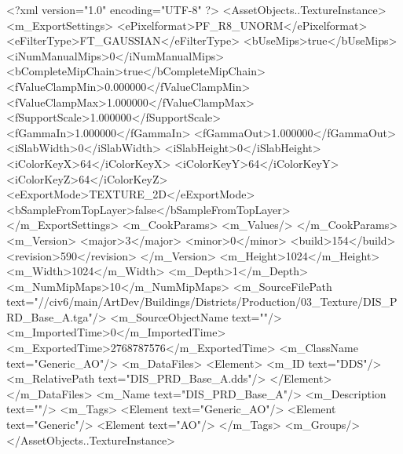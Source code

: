 <?xml version="1.0" encoding="UTF-8" ?>
<AssetObjects..TextureInstance>
	<m_ExportSettings>
		<ePixelformat>PF_R8_UNORM</ePixelformat>
		<eFilterType>FT_GAUSSIAN</eFilterType>
		<bUseMips>true</bUseMips>
		<iNumManualMips>0</iNumManualMips>
		<bCompleteMipChain>true</bCompleteMipChain>
		<fValueClampMin>0.000000</fValueClampMin>
		<fValueClampMax>1.000000</fValueClampMax>
		<fSupportScale>1.000000</fSupportScale>
		<fGammaIn>1.000000</fGammaIn>
		<fGammaOut>1.000000</fGammaOut>
		<iSlabWidth>0</iSlabWidth>
		<iSlabHeight>0</iSlabHeight>
		<iColorKeyX>64</iColorKeyX>
		<iColorKeyY>64</iColorKeyY>
		<iColorKeyZ>64</iColorKeyZ>
		<eExportMode>TEXTURE_2D</eExportMode>
		<bSampleFromTopLayer>false</bSampleFromTopLayer>
	</m_ExportSettings>
	<m_CookParams>
		<m_Values/>
	</m_CookParams>
	<m_Version>
		<major>3</major>
		<minor>0</minor>
		<build>154</build>
		<revision>590</revision>
	</m_Version>
	<m_Height>1024</m_Height>
	<m_Width>1024</m_Width>
	<m_Depth>1</m_Depth>
	<m_NumMipMaps>10</m_NumMipMaps>
	<m_SourceFilePath text="//civ6/main/ArtDev/Buildings/Districts/Production/03_Texture/DIS_PRD_Base_A.tga"/>
	<m_SourceObjectName text=""/>
	<m_ImportedTime>0</m_ImportedTime>
	<m_ExportedTime>2768787576</m_ExportedTime>
	<m_ClassName text="Generic_AO"/>
	<m_DataFiles>
		<Element>
			<m_ID text="DDS"/>
			<m_RelativePath text="DIS_PRD_Base_A.dds"/>
		</Element>
	</m_DataFiles>
	<m_Name text="DIS_PRD_Base_A"/>
	<m_Description text=""/>
	<m_Tags>
		<Element text="Generic_AO"/>
		<Element text="Generic"/>
		<Element text="AO"/>
	</m_Tags>
	<m_Groups/>
</AssetObjects..TextureInstance>

